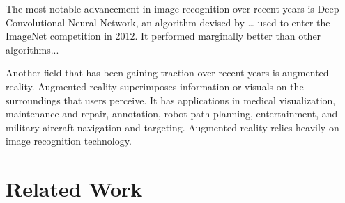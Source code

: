 \documentclass[letterpaper]{article} %
\begin{document}
The most notable advancement in image recognition over recent years is Deep Convolutional Neural Network, an algorithm devised by … used to enter the ImageNet competition in 2012. It performed marginally better than other algorithms...

Another field that has been gaining traction over recent years is augmented reality. Augmented reality superimposes information or visuals on the surroundings that users perceive. It has applications in medical visualization, maintenance and repair, annotation, robot path planning, entertainment, and military aircraft navigation and targeting. Augmented reality relies heavily on image recognition technology.


\section{Related Work}
\end{document}
